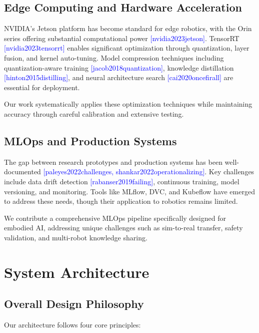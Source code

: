 \documentclass[conference]{IEEEtran}
\newcommand{\cite}[1]{\textcolor{blue}{[#1]}}
\begin{document}
\subsection{Edge Computing and Hardware Acceleration}

NVIDIA's Jetson platform has become standard for edge robotics, with the Orin series offering substantial computational power \cite{nvidia2023jetson}. TensorRT \cite{nvidia2023tensorrt} enables significant optimization through quantization, layer fusion, and kernel auto-tuning. Model compression techniques including quantization-aware training \cite{jacob2018quantization}, knowledge distillation \cite{hinton2015distilling}, and neural architecture search \cite{cai2020oncefirall} are essential for deployment.

Our work systematically applies these optimization techniques while maintaining accuracy through careful calibration and extensive testing.

\subsection{MLOps and Production Systems}

The gap between research prototypes and production systems has been well-documented \cite{paleyes2022challenges, shankar2022operationalizing}. Key challenges include data drift detection \cite{rabanser2019failing}, continuous training, model versioning, and monitoring. Tools like MLflow, DVC, and Kubeflow have emerged to address these needs, though their application to robotics remains limited.

We contribute a comprehensive MLOps pipeline specifically designed for embodied AI, addressing unique challenges such as sim-to-real transfer, safety validation, and multi-robot knowledge sharing.

\section{System Architecture}
\label{sec:architecture}

\subsection{Overall Design Philosophy}

Our architecture follows four core principles:
\end{document}
